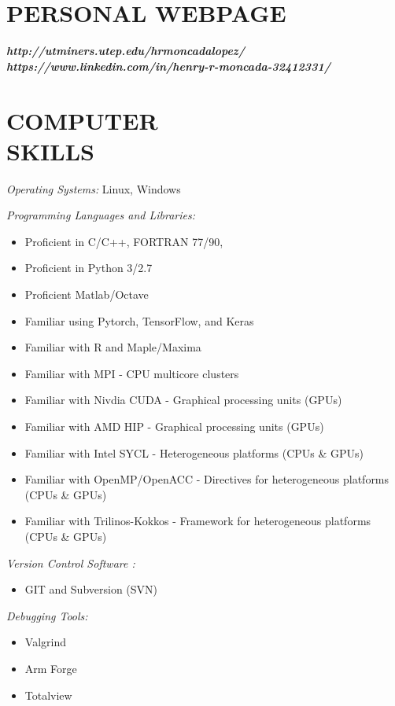 \documentclass[margin]{res}
\begin{document}
\begin{resume}
\section{PERSONAL WEBPAGE}
{\sl \textbf{http://utminers.utep.edu/hrmoncadalopez/}\\
\sl \textbf{https://www.linkedin.com/in/henry-r-moncada-32412331/}
}
                 
\section{COMPUTER \\ SKILLS}
{\sl Operating Systems:} Linux, Windows%

{\sl Programming Languages and Libraries:} %
  \begin{itemize}  \itemsep -1pt 
      \item Proficient in C/C++,  FORTRAN 77/90,
      \item Proficient in Python 3/2.7
      \item Proficient Matlab/Octave 
      \item Familiar using Pytorch, TensorFlow, and Keras 
      \item Familiar with R and Maple/Maxima
      \item Familiar with MPI - CPU multicore clusters
      \item Familiar with Nivdia CUDA - Graphical processing units (GPUs)
      \item Familiar with AMD HIP - Graphical processing units (GPUs)
      \item Familiar with Intel SYCL -  Heterogeneous platforms (CPUs \& GPUs) 
      \item Familiar with OpenMP/OpenACC -  Directives for heterogeneous platforms (CPUs \& GPUs) 
      \item Familiar with Trilinos-Kokkos - Framework for heterogeneous platforms (CPUs \& GPUs)     
    \end{itemize}

{\sl Version Control Software :} %
  \begin{itemize}  \itemsep -1pt 
      \item GIT and Subversion (SVN) 
    \end{itemize}    

{\sl Debugging Tools:}
  \begin{itemize}  \itemsep -1pt  
      \item Valgrind
      \item Arm Forge
      \item Totalview  
    \end{itemize}
    

\end{resume}
\end{document}
